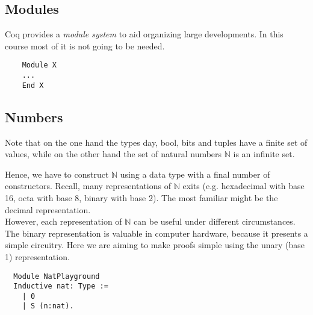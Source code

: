 \subsection{Modules}

	Coq provides a {\itshape module system} to aid organizing large developments.
	In this course most of it is not going to be needed.

	\begin{lstlisting}
	Module X 
	...
	End X
	\end{lstlisting}

\subsection{Numbers}

  Note that on the one hand the types day, bool, bits and tuples have a finite set of values, while on the other hand the set of natural numbers $\mathbb{N}$ is an infinite set.
 
  Hence, we have to construct $\mathbb{N}$ using a data type with a final number of constructors. 
  Recall, many representations of $\mathbb{N}$ exits (e.g. hexadecimal with base 16, octa with base 8, binary with base 2).
  The most familiar might be the decimal representation.\\
  However, each representation of $\mathbb{N}$ can be useful under different circumstances. 
  The binary representation is valuable in computer hardware, because it presents a simple circuitry.
  Here we are aiming to make proofs simple using the unary (base 1) representation.
  
  \begin{lstlisting}
  Module NatPlayground
  Inductive nat: Type :=
    | 0
    | S (n:nat).
  \end{lstlisting}
  
